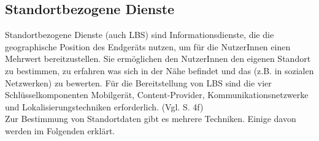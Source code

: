 \subsection{Standortbezogene Dienste}
Standortbezogene Dienste (auch \gls{LBS}) sind Informationsdienste, die die geographische Position des Endgeräts nutzen, um für die NutzerInnen einen Mehrwert bereitzustellen. Sie ermöglichen den NutzerInnen den eigenen Standort zu bestimmen, zu erfahren was sich in der Nähe befindet und das (z.B. in sozialen Netzwerken) zu bewerten. Für die Bereitstellung von \gls{LBS} sind die vier Schlüsselkomponenten Mobilgerät, Content-Provider, Kommunikationsnetzwerke und Lokalisierungstechniken erforderlich. (Vgl. \cite{gps} S. 4f)\\
Zur Bestimmung von Standortdaten gibt es mehrere Techniken. Einige davon werden im Folgenden erklärt.\\ 
%
%

